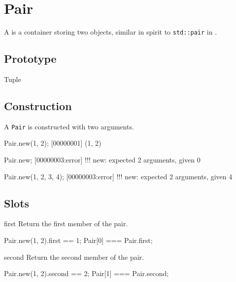 
\section{Pair}

A  is a container storing two objects, similar in spirit to
\lstinline|std::pair| in \Cxx.

\subsection{Prototype}
\begin{refObjects}
\item[Tuple]
\end{refObjects}

\subsection{Construction}

A \lstinline|Pair| is constructed with two arguments.

\begin{urbiscript}[firstnumber=1]
Pair.new(1, 2);
[00000001] (1, 2)

Pair.new;
[00000003:error] !!! new: expected 2 arguments, given 0

Pair.new(1, 2, 3, 4);
[00000003:error] !!! new: expected 2 arguments, given 4
\end{urbiscript}

\subsection{Slots}
\begin{urbiscriptapi}
\item[first]
  Return the first member of the pair.
\begin{urbiassert}
Pair.new(1, 2).first == 1;
Pair[0] === Pair.first;
\end{urbiassert}

\item[second]
  Return the second member of the pair.
\begin{urbiassert}
Pair.new(1, 2).second == 2;
Pair[1] === Pair.second;
\end{urbiassert}
\end{urbiscriptapi}



